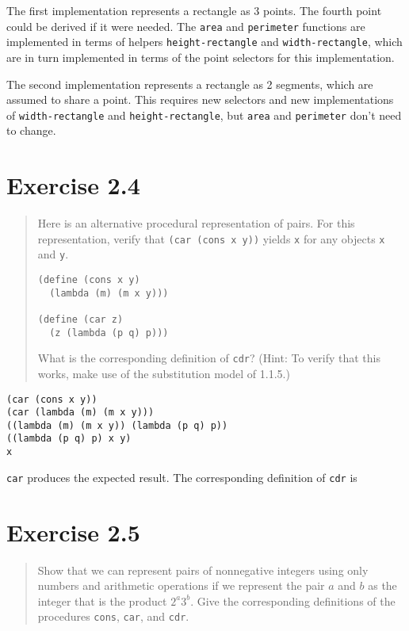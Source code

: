 \documentclass{article}
\begin{document}
The first implementation represents a rectangle as 3 points. The fourth point
could be derived if it were needed. The \texttt{area} and \texttt{perimeter}
functions are implemented in terms of helpers \texttt{height-rectangle} and
\texttt{width-rectangle}, which are in turn implemented in terms of the point
selectors for this implementation.


The second implementation represents a rectangle as 2 segments, which are
assumed to share a point. This requires new selectors and new implementations of
\texttt{width-rectangle} and \texttt{height-rectangle}, but \texttt{area} and
\texttt{perimeter} don't need to change.


\section{Exercise 2.4}
\begin{quote}
    Here is an alternative procedural representation of pairs. For this
    representation, verify that \texttt{(car (cons x y))} yields \texttt{x} for
    any objects \texttt{x} and \texttt{y}.
    \begin{lstlisting}
(define (cons x y)
  (lambda (m) (m x y)))

(define (car z)
  (z (lambda (p q) p)))
    \end{lstlisting}
    What is the corresponding definition of \texttt{cdr}? (Hint: To verify that
    this works, make use of the substitution model of 1.1.5.)
\end{quote}

\begin{lstlisting}
(car (cons x y))
(car (lambda (m) (m x y)))
((lambda (m) (m x y)) (lambda (p q) p))
((lambda (p q) p) x y)
x
\end{lstlisting}
\texttt{car} produces the expected result. The corresponding definition of
\texttt{cdr} is


\section{Exercise 2.5}
\begin{quote}
    Show that we can represent pairs of nonnegative integers using only numbers
    and arithmetic operations if we represent the pair $a$ and $b$ as the
    integer that is the product $2^a3^b$. Give the corresponding definitions of
    the procedures \texttt{cons}, \texttt{car}, and \texttt{cdr}.
\end{quote}
\end{document}
